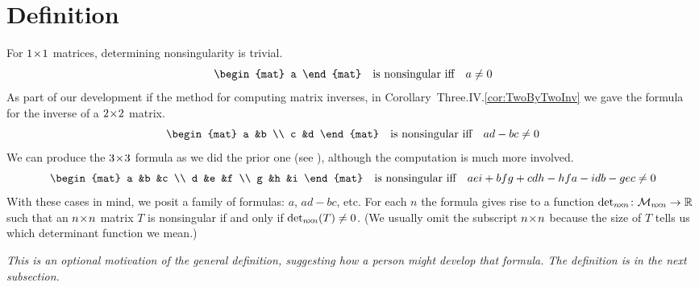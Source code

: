 \section{Def{}inition}
For \( 1 \! \times \! 1 \) matrices, determining nonsingularity
is trivial.
\begin{equation*}
  \begin{mat}
       a
  \end{mat} 
  \quad\text{is nonsingular iff}\quad
  a \neq 0
\end{equation*}
As part of our development if the method for  
computing matrix inverses, in 
Corollary~Three.IV.\ref{cor:TwoByTwoInv} we gave the formula for 
the inverse of a $2 \! \times \! 2$ matrix. 
\begin{equation*}
     \begin{mat}
           a  &b  \\
           c  &d
      \end{mat}  
   \quad\text{is nonsingular iff}\quad
   ad-bc \neq 0
\end{equation*}
We can produce the $3 \! \times \! 3$ formula as we did the prior one  
(see ),
although the computation is much more involved.
\begin{equation*}
     \begin{mat}
           a  &b  &c  \\
           d  &e  &f  \\
           g  &h  &i
     \end{mat}
  \quad\text{is nonsingular iff}\quad
    aei+bfg+cdh-hfa-idb-gec \neq 0
\end{equation*}
With these cases in mind, we posit a family of 
formulas: $a$, $ad-bc$, etc. 
For each $n$ the formula gives rise to a 
function
$\mbox{$\det_{n \! \times \! n}\colon \mathcal{M}_{n \! \times \! n}\to \mathbb{R}$}$ 
such that an $n \! \times \! n$ matrix $T$ is nonsingular if and
only if $\det_{n \! \times \! n}(T)\neq 0$.
(We usually omit the subscript \( n \! \times \! n \) because 
the size of \( T \) tells us which determinant function we mean.)






\textit{This is an optional
motivation of the general definition, suggesting how a person might
develop that formula.
The definition is in the next 
subsection.}

